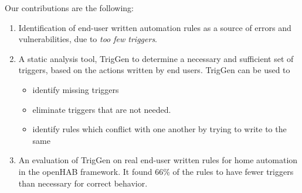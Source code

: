 \documentclass{sig-alternate-05-2015}
\begin{document}
Our contributions are the following:
\begin{enumerate}[topsep=0pt,itemsep=-1ex]
\item Identification of end-user written automation rules as a source of
  errors and vulnerabilities, due to \textit{too few triggers}.
\item A static analysis tool, TrigGen to determine a necessary and sufficient set of
  triggers, based on the actions written by end users.
  TrigGen can be used to
\begin{itemize}[topsep=-10pt,itemsep=-1ex,partopsep=1ex,parsep=1ex]
\item identify missing triggers 
\item eliminate triggers that are not needed.
\item identify rules which conflict with one another by trying to write to the same 
\end{itemize}
\item An evaluation of TrigGen on real end-user written rules for home
  automation in the openHAB framework. It found 66\% of the rules to have fewer triggers than necessary for correct behavior. 
\end{enumerate}
\end{document}

